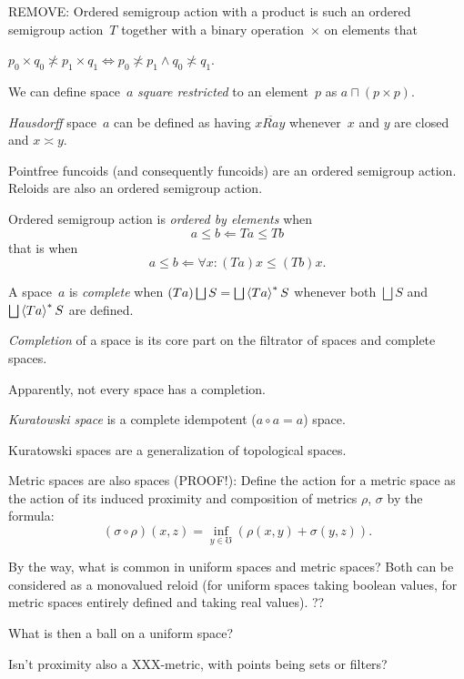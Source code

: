 REMOVE: Ordered semigroup action with a product is such an ordered semigroup action~$T$ together with a binary operation~$\times$ on elements that 

\begin{thm}
$p_0\times q_0\nasymp p_1\times q_1 \Leftrightarrow p_0\nasymp p_1\land q_0\nasymp q_1$.
\end{thm}

We can define space~$a$ \emph{square restricted} to an element~$p$ as $a\sqcap(p\times p)$.

\emph{Hausdorff} space~$a$ can be defined as having $x\overline{Ra}y$ whenever~$x$ and $y$ are closed and $x\asymp y$.

Pointfree funcoids (and consequently funcoids) are an ordered semigroup action. Reloids are also an ordered semigroup action.

Ordered semigroup action is \emph{ordered by elements} when \[ a\leq b \Leftarrow Ta\leq Tb \] that is when \[ a\leq b \Leftarrow \forall x:(Ta)x\leq(Tb)x. \]

A space~$a$ is \emph{complete} when $(Ta)\bigsqcup S=\bigsqcup\rsupfun{Ta}S$ whenever both $\bigsqcup S$ and $\bigsqcup\rsupfun{Ta}S$ are defined.

\begin{defn}
\emph{Completion} of a space is its core part on the filtrator of spaces and complete spaces.
\end{defn}

\begin{note}
Apparently, not every space has a completion.
\end{note}

\begin{defn}
\emph{Kuratowski space} is a complete idempotent ($a\circ a=a$) space.
\end{defn}

Kuratowski spaces are a generalization of topological spaces.

Metric spaces are also spaces (PROOF!): Define the action for a metric space as the action of its induced proximity and composition of metrics $\rho$, $\sigma$ by the formula: \[ (\sigma\circ\rho)(x,z) = \inf_{y\in\mho}(\rho(x,y)+\sigma(y,z)). \]

By the way, what is common in uniform spaces and metric spaces? Both can be considered as a monovalued reloid (for uniform spaces taking boolean values, for metric spaces entirely defined and taking real values). ??

What is then a ball on a uniform space?

Isn't proximity also a XXX-metric, with points being sets or filters?
